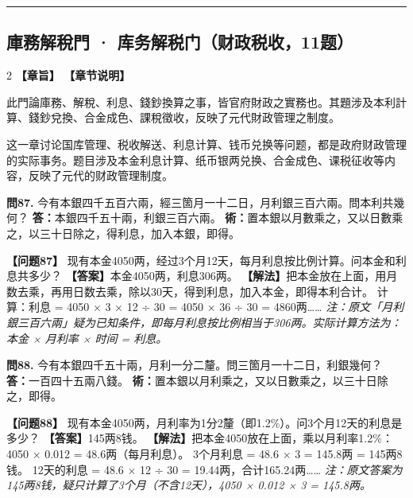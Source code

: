 \documentclass[11pt,a4paper]{article}
\newcommand{\longline}{\noindent\rule{\textwidth}{0.4pt}}
\begin{document}
\longline

\subsection{庫務解稅門 · 库务解税门（财政税收，11题）}
\label{sec:kuwu}

\begin{paracol}{2}
\noindent\textbf{\textcolor{leftlabel}{【章旨】}}
\switchcolumn
\noindent\textbf{\textcolor{rightlabel}{【章节说明】}}
\switchcolumn*

此門論庫務、解稅、利息、錢鈔換算之事，皆官府財政之實務也。其題涉及本利計算、錢鈔兌換、合金成色、課稅徵收，反映了元代財政管理之制度。

\switchcolumn

这一章讨论国库管理、税收解送、利息计算、钱币兑换等问题，都是政府财政管理的实际事务。题目涉及本金利息计算、纸币银两兑换、合金成色、课税征收等内容，反映了元代的财政管理制度。

\switchcolumn*

\textbf{問87.} 今有本銀四千五百六兩，經三箇月一十二日，月利銀三百六兩。問本利共幾何？\break
\textbf{答：}本銀四千五十兩，利銀三百六兩。\break
\textbf{術：}置本銀以月數乘之，又以日數乘之，以三十日除之，得利息，加入本銀，即得。

\switchcolumn

\textbf{【问题87】} 现有本金4050两，经过3个月12天，每月利息按比例计算。问本金和利息共多少？\break
\textbf{【答案】}本金4050两，利息306两。\break
\textbf{【解法】}把本金放在上面，用月数去乘，再用日数去乘，除以30天，得到利息，加入本金，即得本利合计。\break
计算：利息 = 4050 × 3 × 12 ÷ 30 = 4050 × 36 ÷ 30 = 4860两……\break
\textit{注：原文「月利銀三百六兩」疑为已知条件，即每月利息按比例相当于306两。实际计算方法为：本金 × 月利率 × 时间 = 利息。}

\switchcolumn*

\textbf{問88.} 今有本銀四千五十兩，月利一分二釐。問三箇月一十二日，利銀幾何？\break
\textbf{答：}一百四十五兩八錢。\break
\textbf{術：}置本銀以月利乘之，又以日數乘之，以三十日除之，即得。

\switchcolumn

\textbf{【问题88】} 现有本金4050两，月利率为1分2釐（即1.2\%）。问3个月12天的利息是多少？\break
\textbf{【答案】}145两8钱。\break
\textbf{【解法】}把本金4050放在上面，乘以月利率1.2\%：4050 × 0.012 = 48.6两（每月利息）。\break
3个月利息 = 48.6 × 3 = 145.8两 = 145两8钱。\break
12天的利息 = 48.6 × 12 ÷ 30 = 19.44两，合计165.24两……\break
\textit{注：原文答案为145两8钱，疑只计算了3个月（不含12天），4050 × 0.012 × 3 = 145.8两。}


\end{paracol}
\end{document}
